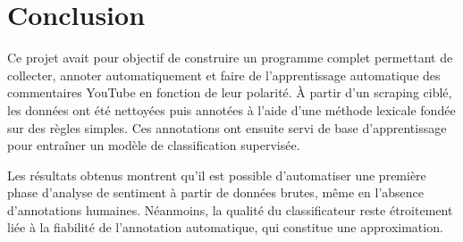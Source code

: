 \documentclass[a4paper, 12pt, openany]{book}
\begin{document}


\chapter*{Conclusion}
Ce projet avait pour objectif de construire un programme complet permettant de collecter, annoter automatiquement et faire de l'apprentissage automatique des commentaires YouTube en fonction de leur polarité. À partir d’un scraping ciblé, les données ont été nettoyées puis annotées à l’aide d’une méthode lexicale fondée sur des règles simples. Ces annotations ont ensuite servi de base d’apprentissage pour entraîner un modèle de classification supervisée.

Les résultats obtenus montrent qu’il est possible d’automatiser une première phase d’analyse de sentiment à partir de données brutes, même en l’absence d’annotations humaines. Néanmoins, la qualité du classificateur reste étroitement liée à la fiabilité de l’annotation automatique, qui constitue une approximation.
\end{document}
